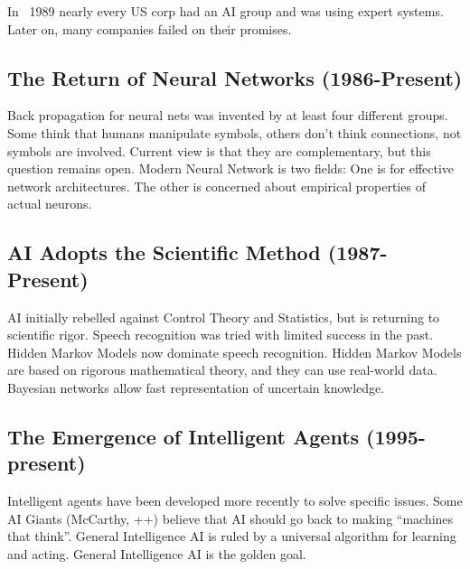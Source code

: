 In ~1989 nearly every US corp had an AI group and was using expert systems.
Later on, many companies failed on their promises.


\subsection{The Return of Neural Networks (1986-Present)} %
\label{sub:the_return_of_neural_networks_}

Back propagation for neural nets was invented by at least four different groups.
Some think that humans manipulate symbols, others don't think connections, not
symbols are involved.
Current view is that they are complementary, but this question remains open.
Modern Neural Network is two fields:
One is for effective network architectures.
The other is concerned about empirical properties of actual neurons.


\subsection{AI Adopts the Scientific Method (1987-Present)} %
\label{sub:ai_adopts_the_scientific_method_}

AI initially rebelled against Control Theory and Statistics, but is returning to
scientific rigor.
Speech recognition was tried with limited success in the past.
Hidden Markov Models now dominate speech recognition.
Hidden Markov Models are based on rigorous mathematical theory, and they can use
real-world data.
Bayesian networks allow fast representation of uncertain knowledge.


\subsection{The Emergence of Intelligent Agents (1995-present)} %
\label{sub:the_emergence_of_intelligent_agents}

Intelligent agents have been developed more recently to solve specific issues.
Some AI Giants (McCarthy, ++) believe that AI should go back to making
``machines that think''.
General Intelligence AI is ruled by a universal algorithm for learning and
acting.
General Intelligence AI is the golden goal.

